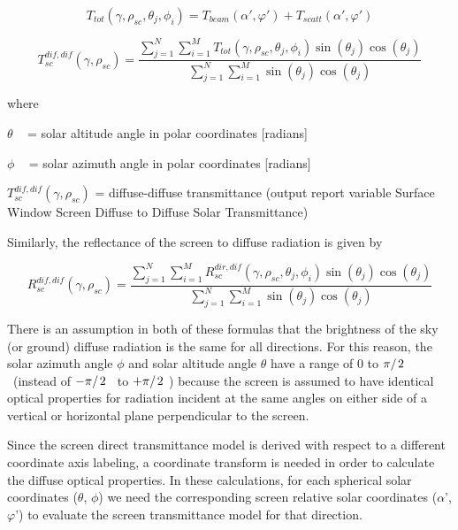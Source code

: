 \begin{equation}
{T_{tot}}(\gamma ,{\rho_{sc}},{\theta_j},{\phi_i}) = {T_{beam}}\left( {\alpha ',\varphi '} \right) + {T_{scatt}}\left( {\alpha ',\varphi '} \right)
\end{equation}

\begin{equation}
T_{sc}^{dif,dif}(\gamma ,{\rho_{sc}}) = \frac{{\sum\limits_{j = 1}^N {\sum\limits_{i = 1}^M {{T_{tot}}(\gamma ,{\rho_{sc}},{\theta_j},{\phi_i})\sin ({\theta_j})\cos ({\theta_j})} } }}{{\sum\limits_{j = 1}^N {\sum\limits_{i = 1}^M {\sin ({\theta_j})\cos ({\theta_j})} } }}
\end{equation}

where

\(\theta\) ~ = solar altitude angle in polar coordinates {[}radians{]}

\(\phi\) ~ = solar azimuth angle in polar coordinates {[}radians{]}

\(T_{sc}^{dif,dif}(\gamma ,{\rho_{sc}})\) = diffuse-diffuse transmittance (output report variable Surface Window Screen Diffuse to Diffuse Solar Transmittance)

Similarly, the reflectance of the screen to diffuse radiation is given by

\begin{equation}
R_{sc}^{dif,dif}(\gamma ,{\rho_{sc}}) = \frac{{\sum\limits_{j = 1}^N {\sum\limits_{i = 1}^M {R_{sc}^{dir,dif}(\gamma ,{\rho_{sc}},{\theta_j},{\phi_i})\sin ({\theta_j})\cos ({\theta_j})} } }}{{\sum\limits_{j = 1}^N {\sum\limits_{i = 1}^M {\sin ({\theta_j})\cos ({\theta_j})} } }}
\end{equation}

There is an assumption in both of these formulas that the brightness of the sky (or ground) diffuse radiation is the same for all directions. For this reason, the solar azimuth angle \(\phi\) and solar altitude angle \(\theta\) have a range of 0 to \({\pi \mathord{\left/ {\vphantom {\pi 2}} \right. } 2}\) ~(instead of \({{ - \pi } \mathord{\left/ {\vphantom {{ - \pi } 2}} \right. } 2}\) ~to \({{ + \pi } \mathord{\left/ {\vphantom {{ + \pi } 2}} \right. } 2}\) ) because the screen is assumed to have identical optical properties for radiation incident at the same angles on either side of a vertical or horizontal plane perpendicular to the screen.

Since the screen direct transmittance model is derived with respect to a different coordinate axis labeling, a coordinate transform is needed in order to calculate the diffuse optical properties. In these calculations, for each spherical solar coordinates (\(\theta\), \(\phi\)) we need the corresponding screen relative solar coordinates (\(\alpha\)', \(\varphi\)') to evaluate the screen transmittance model for that direction.

